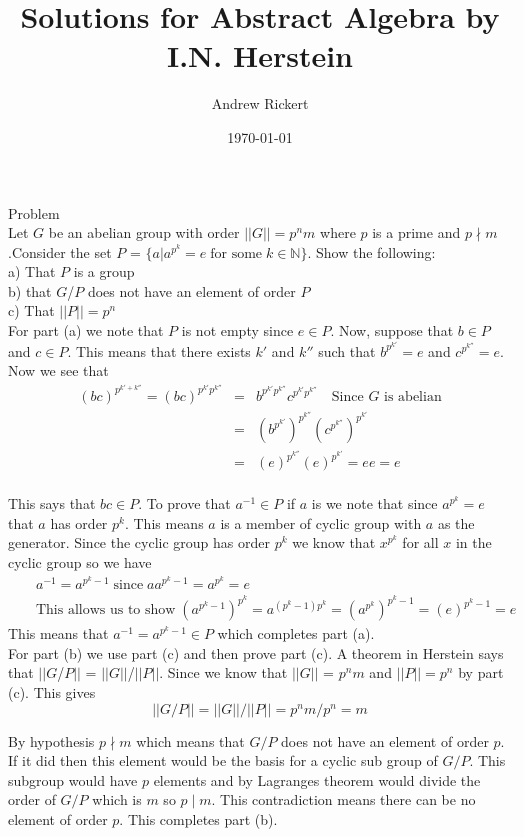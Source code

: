 \documentclass[11pt, oneside]{article}   	%
\title{Solutions for Abstract Algebra by I.N. Herstein}
\author{Andrew Rickert}
\date{\today}							%
\begin{document}
\maketitle

Problem\\
Let $G$ be an abelian group with order $|| G || = p^n m$ where $p$ is a prime and $p \nmid m$.Consider the set $P$ = $\{ a | a^{p^k} = e \; \text{for some} \; k \in \mathbb{N} \}$. Show the following: \\
a) That $P$ is a group \\
b) that $G$/$P$ does not have an element of order $P$ \\
c) That $|| P || = p^n$ \\

For part (a) we note that $P$ is not empty since $e \in P$. Now, suppose that $b \in P$ and $c \in P$. This means that there exists $k'$ and $k''$ such that $b^{p^{k'}} = e$ and $c^{p^{k''}} = e$. Now we see that 
\begin{eqnarray*} 
(bc)^{p^{k' + k''}} = (bc)^{p^{k'} p^ {k''}} &=&  b^{p^{k'} p^ {k''}} c^{p^{k'} p^ {k''}} \quad \text{Since $G$ is abelian}\\
&=& (b^{p^{k'}})^{p^ {k''}} (c^{p^{k''}})^{p^ {k'}} \\
&=& (e)^{p^ {k''}} (e)^{p^ {k'}} = e e = e \\
\end{eqnarray*}

\noindent This says that $bc \in P$. To prove that $a^{-1} \in P$ if $a$ is we note that since $a^{p^k} = e$ that $a$ has order $p^k$. This means $a$ is a member of cyclic group with $a$ as the generator. Since the cyclic group has order $p^k$ we know that $x^{p^k}$ for all $x$ in the cyclic group so we have
\begin{eqnarray*}
&&a^{-1} = a^{p^k - 1} \; \text{since} \; a a^{p^k - 1} = a^{p^k} = e \\
&&\text{This allows us to show} \; (a^{p^k - 1})^{p^k} = a^{(p^k - 1) p^k} = (a^{p^k})^{p^k-1} = (e)^{p^k-1} = e
\end{eqnarray*}
This means that $a^{-1} = a^{p^k - 1} \in P$ which completes part (a).\\

\noindent For part (b) we use part (c) and then prove part (c). A theorem in Herstein says that $||G$/$P||$ = $||G||$/$||P||$. Since we know that $||G||$ = $p^n m$ and $||P|| = p^n$ by part (c). This gives
\[ ||G/P|| = ||G||/||P|| = p^n m / p^n = m \]

By hypothesis $p \nmid m$ which means that $G / P$ does not have an element of order $p$. If it did then this element would be the basis for a cyclic sub group of $G / P$. This subgroup would have $p$ elements and by Lagranges theorem would divide the order of $G / P$ which is $m$ so $p \mid m$. This contradiction means there can be no element of order $p$. This completes part (b).
\end{document}

